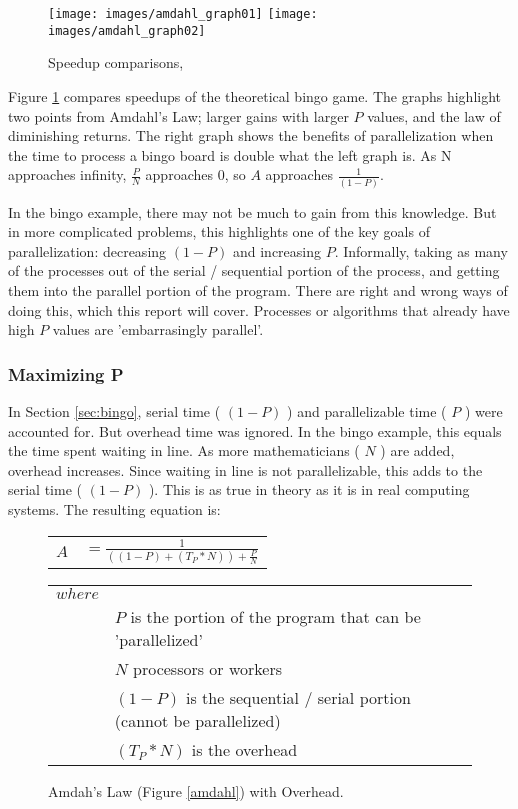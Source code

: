 \begin{figure}[h]
	\begin{center}
		\texttt{[image: images/amdahl\_graph01]}
		\texttt{[image: images/amdahl\_graph02]}
		\caption{Speedup comparisons,} 
		\label{amdahl_graph}
	\end{center}
\end{figure}

Figure \ref{amdahl_graph} compares speedups of the theoretical bingo game. The graphs highlight two points
from Amdahl's Law; larger gains with larger $ P $ values, and the law of diminishing returns. The right graph
shows the benefits of parallelization when the time to process a bingo board is double what the left graph is.
As N approaches infinity, $ \frac{P}{N} $ approaches 0, so $ A $ approaches $\frac{1}{(1 - P)} $. 

In the bingo example, there may not be much to gain from this knowledge. But in more complicated problems,
this highlights one of the key goals of parallelization: decreasing $ (1 - P) $ and increasing $ P $. Informally,
taking as many of the processes out of the serial / sequential portion of the process, and getting them into
the parallel portion of the program. There are right and wrong ways of doing this, which this report will cover.
Processes or algorithms that already have high $ P $ values are 'embarrasingly parallel'.

\subsubsection{Maximizing P}
In Section \ref{sec:bingo}, serial time ( $ (1 - P) $ ) and parallelizable time ( $ P $ ) were accounted for. But 
overhead time was ignored. In the bingo example, this equals the time spent waiting in line. As more 
mathematicians ( $ N $ ) are added, overhead increases. Since waiting in line is not parallelizable, this adds 
to the serial time ( $ (1 - P) $ ). This is as true in theory as it is in real computing systems. The resulting 
equation is:

\begin{figure}[h]
	\begin{center}
		\LARGE
		\begin{tabular}{l r}
			$ A $		&	$ = \frac{1}{((1 - P) + (T_P * N)) + \frac{P}{N}} $ \\
		\end{tabular}

		\normalsize
		\begin{tabular}{l l}
			$ where $  & \\
					&	$ P $ is the portion of the program that can be 'parallelized' \\
					&	$ N $ processors or workers \\
					&	$ (1 - P) $ is the sequential / serial portion (cannot be parallelized) \\
					&	$ (T_P * N) $ is the overhead \\
		\end{tabular}
		\caption{Amdah's Law (Figure \ref{amdahl}) with Overhead. } 
		\label{amdahl_overhead}
	\end{center}
\end{figure}
\normalsize

